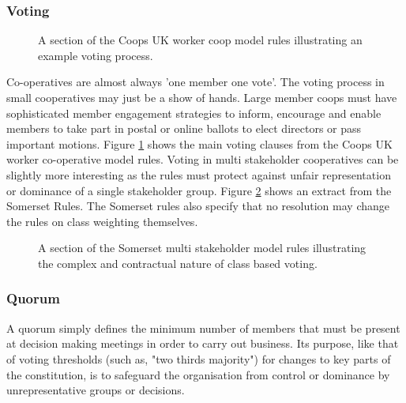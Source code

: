 \subsubsection{Voting}
\begin{figure}
\centering
{}
\decoRule
\caption[]{A section of the Coops UK worker coop model rules illustrating an example voting process.}
\label{fig:WorkerRulesVoting}
\end{figure} 
Co-operatives are almost always 'one member one vote'. The voting process in small cooperatives may just be a show of hands. Large member coops must have sophisticated member engagement strategies to inform, encourage and enable members to take part in postal or online ballots to elect directors or pass important motions. Figure \ref{fig:WorkerRulesVoting} shows the main voting clauses from the Coops UK worker co-operative model rules. Voting in multi stakeholder cooperatives can be slightly more interesting as the rules must protect against unfair representation or dominance of a single stakeholder group. Figure \ref{fig:SomersetVoting} shows an extract from the Somerset Rules. The Somerset rules also specify that no resolution may change the rules on class weighting themselves. 
\begin{figure}
\centering
{}
\decoRule
\caption[]{A section of the Somerset multi stakeholder model rules illustrating the complex and contractual nature of class based voting.}
\label{fig:SomersetVoting}
\end{figure} 

\subsubsection{Quorum}
A quorum simply defines the minimum number of members that must be present at decision making meetings in order to carry out business. Its purpose, like that of voting thresholds (such as, "two thirds majority") for changes to key parts of the constitution, is to safeguard the organisation from control or dominance by unrepresentative groups or decisions.

